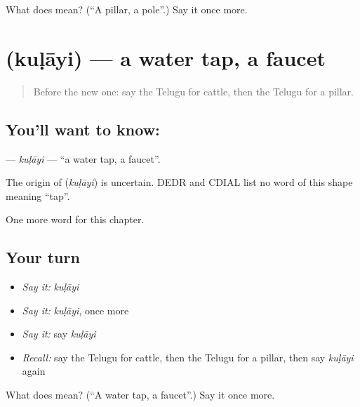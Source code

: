 \begin{tcolorbox}[breakable,colback=teal!4,colframe=teal!35!black,title={Before you move on}]
What does  mean? (\textquotedblleft{}A pillar, a pole\textquotedblright{}.) Say it once more.
\end{tcolorbox}
\section[\texorpdfstring{\te{కుళాయి} (kuḷāyi)}{కుళాయి (kuḷāyi)}]{ (kuḷāyi) — a water tap, a faucet}

\label{lesson:TE-C309-kulayi}



\begin{quote}
Before the new one: say the Telugu for cattle, then the Telugu for a pillar.
\end{quote}

\subsection*{You'll want to know: }
\textbf{} — \emph{kuḷāyi} — \textquotedblleft{}a water tap, a faucet\textquotedblright{}.

\begin{cousinweb}
The origin of \textbf{} (\emph{kuḷāyi}) is uncertain. DEDR and CDIAL list no word of this shape meaning \textquotedblleft{}tap\textquotedblright{}.
\end{cousinweb}

\begin{grammarlens}[title={What you've built}]
One more word for this chapter.
\end{grammarlens}

\subsection*{Your turn}
\begin{itemize}
\raggedright
  \item \emph{Say it:} \emph{kuḷāyi}
  \item \emph{Say it:} \emph{kuḷāyi}, once more
  \item \emph{Say it:} say \emph{kuḷāyi}
  \item \emph{Recall:} say the Telugu for cattle, then the Telugu for a pillar, then say \emph{kuḷāyi} again
\end{itemize}

\begin{tcolorbox}[breakable,colback=teal!4,colframe=teal!35!black,title={Before you move on}]
What does  mean? (\textquotedblleft{}A water tap, a faucet\textquotedblright{}.) Say it once more.
\end{tcolorbox}
